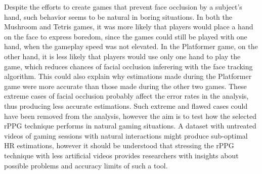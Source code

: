 Despite the efforts to create games that prevent face occlusion by a subject's hand, such behavior seems to be natural in boring situations. In both the Mushroom and Tetris games, it was more likely that players would place a hand on the face to express boredom, since the games could still be played with one hand, when the gameplay speed was not elevated. In the Platformer game, on the other hand, it is less likely that players would use only one hand to play the game, which reduces chances of facial occlusion inferering with the face tracking algorithm. This could also explain why estimations made during the Platformer game were more accurate than those made during the other two games. These extreme cases of facial occlusion probably affect the error rates in the analysis, thus producing less accurate estimations. Such extreme and flawed cases could have been removed from the analysis, however the aim is to test how the selected rPPG technique performs in natural gaming situations. A dataset with untreated videos of gaming sessions with natural interactions might produce sub-optimal HR estimations, however it should be understood that stressing the rPPG technique with less artificial videos provides researchers with insights about possible problems and accuracy limits of such a tool.

